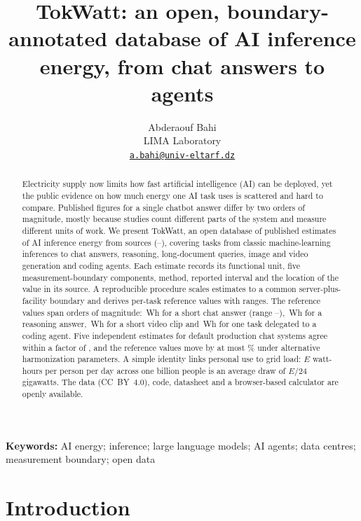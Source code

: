\documentclass[11pt]{article}
\title{\textbf{TokWatt: an open, boundary-annotated database of AI inference energy, from chat answers to agents}}
\author{Abderaouf Bahi\\[2pt]
LIMA Laboratory\\[2pt]
\href{mailto:a.bahi@univ-eltarf.dz}{\texttt{a.bahi@univ-eltarf.dz}}}
\date{}
\newcommand{\Wh}{\,Wh}
\begin{document}
\maketitle

\begin{abstract}
\noindent Electricity supply now limits how fast artificial intelligence (AI) can be deployed, yet the public evidence on how much energy one AI task uses is scattered and hard to compare. Published figures for a single chatbot answer differ by two orders of magnitude, mostly because studies count different parts of the system and measure different units of work. We present TokWatt, an open database of \nEst{} published estimates of AI inference energy from \nSrcEst{} sources (\yearMin--\yearMax), covering \nTasks{} tasks from classic machine-learning inferences to chat answers, reasoning, long-document queries, image and video generation and coding agents. Each estimate records its functional unit, five measurement-boundary components, method, reported interval and the location of the value in its source. A reproducible procedure scales estimates to a common server-plus-facility boundary and derives per-task reference values with ranges. The reference values span \oomWord{} orders of magnitude: \Wh{} for a short chat answer (range --), \Wh{} for a reasoning answer, \Wh{} for a short video clip and \Wh{} for one task delegated to a coding agent. Five independent estimates for default production chat systems agree within a factor of \clusterRatio, and the reference values move by at most \sensMaxPct\% under alternative harmonization parameters. A simple identity links personal use to grid load: $E$ watt-hours per person per day across one billion people is an average draw of $E/24$ gigawatts. The data (CC~BY~4.0), code, datasheet and a browser-based calculator are openly available.
\end{abstract}

\noindent\textbf{Keywords:} AI energy; inference; large language models; AI agents; data centres; measurement boundary; open data

\section{Introduction}
\label{sec:intro}
\end{document}
